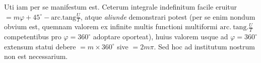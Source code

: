 \expandafter\def\csname HistoricalNoteText13\endcsname{Uti iam per se manifestum est. Ceterum integrale indefinitum facile eruitur $=m\varphi+45^\circ-\mathrm{arc.tang}\frac UT$,
atque \textit{aliunde} demonstrari potest (per se enim nondum obvium est, quemnam valorem ex infinite multis functioni
multiformi $\mathrm{arc.\ tang.}\frac UT$ competentibus pro $\varphi=360^\circ$ adoptare oporteat), huius valorem usque ad $\varphi=360^\circ$
extensum statui debere $=m\times360^\circ$ sive $=2m\pi$. Sed hoc ad institutum nostrum non est necessarium.}

